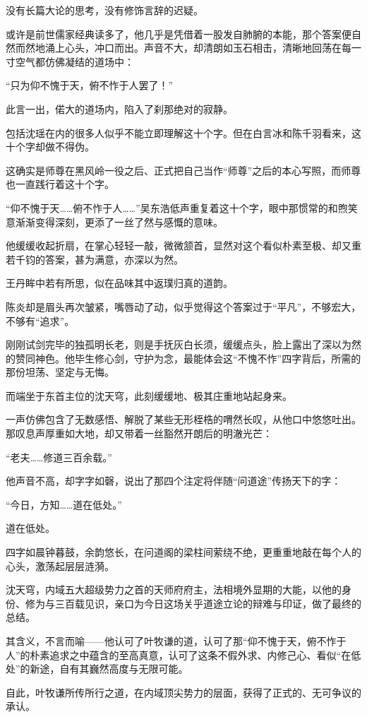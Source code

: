 没有长篇大论的思考，没有修饰言辞的迟疑。

或许是前世儒家经典读多了，他几乎是凭借着一股发自肺腑的本能，那个答案便自然而然地涌上心头，冲口而出。声音不大，却清朗如玉石相击，清晰地回荡在每一寸空气都仿佛凝结的道场中：

“只为仰不愧于天，俯不怍于人罢了！”

此言一出，偌大的道场内，陷入了刹那绝对的寂静。

包括沈瑶在内的很多人似乎不能立即理解这十个字。但在白言冰和陈千羽看来，这十个字却做不得伪。

这确实是师尊在黑风岭一役之后、正式把自己当作“师尊”之后的本心写照，而师尊也一直践行着这十个字。

“仰不愧于天……俯不怍于人……”吴东浩低声重复着这十个字，眼中那惯常的和煦笑意渐渐变得深刻，更添了一丝了然与感慨的意味。

他缓缓收起折扇，在掌心轻轻一敲，微微颔首，显然对这个看似朴素至极、却又重若千钧的答案，甚为满意，亦深以为然。

王丹眸中若有所思，似在品味其中返璞归真的道韵。

陈炎却是眉头再次皱紧，嘴唇动了动，似乎觉得这个答案过于“平凡”，不够宏大，不够有“追求”。

刚刚试剑完毕的独孤明长老，则是手抚灰白长须，缓缓点头，脸上露出了深以为然的赞同神色。他毕生修心剑，守护为念，最能体会这“不愧不怍”四字背后，所需的那份坦荡、坚定与无悔。

而端坐于东首主位的沈天穹，此刻缓缓地、极其庄重地站起身来。

一声仿佛包含了无数感悟、解脱了某些无形桎梏的喟然长叹，从他口中悠悠吐出。那叹息声厚重如大地，却又带着一丝豁然开朗后的明澈光芒：

“老夫……修道三百余载。”

他声音不高，却字字如磬，说出了那四个注定将伴随“问道途”传扬天下的字：

“今日，方知……道在低处。”

道在低处。

四字如晨钟暮鼓，余韵悠长，在问道阁的梁柱间萦绕不绝，更重重地敲在每个人的心头，激荡起层层涟漪。

沈天穹，内域五大超级势力之首的天师府府主，法相境外显期的大能，以他的身份、修为与三百载见识，亲口为今日这场关乎道途立论的辩难与印证，做了最终的总结。

其含义，不言而喻——他认可了叶牧谦的道，认可了那“仰不愧于天，俯不怍于人”的朴素追求之中蕴含的至高真意，认可了这条不假外求、内修己心、看似“在低处”的新途，自有其巍然高度与无限可能。

自此，叶牧谦所传所行之道，在内域顶尖势力的层面，获得了正式的、无可争议的承认。

